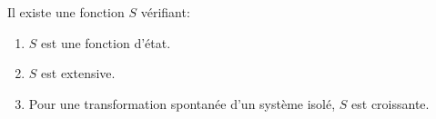 \documentclass[a4paper]{article}
\begin{document}
\pagestyle{fancy}
\fancyhf{}
\setlength{\headheight}{15pt}

\begin{center}
	\large{}
\end{center}


Il existe une fonction \(S\) vérifiant:
\begin{enumerate}
\item \(S\) est une fonction d'état.
\item \(S\) est extensive.
\item Pour une transformation spontanée d'un système isolé, \(S\) est croissante.
\end{enumerate}
\end{document}
